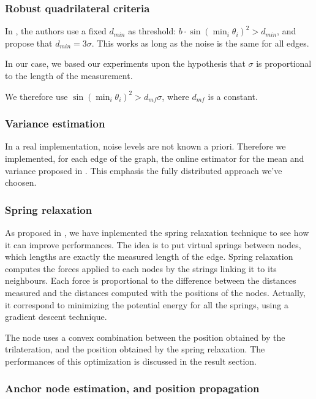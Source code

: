 \documentclass[letterpaper, 10 pt, conference]{ieeeconf}  %
\begin{document}
\subsubsection{Robust quadrilateral criteria}

In \cite{MooreTeller}, the authors use a fixed $d_{min}$ as threshold:  $b \cdot \sin(\min_i \theta_i)^2 > d_{min}$, and propose that $d_{min}=3\sigma$. This works as long as the noise is the same for all edges. 

In our case, we based our experiments upon the hypothesis that $\sigma$ is proportional to the length of the measurement.

We therefore use $\sin(\min_i \theta_i)^2 > d_{mf} \sigma$, where $d_{mf}$ is a constant.

\subsubsection{Variance estimation}

In a real implementation, noise levels are not known a priori. Therefore we implemented, for each edge of the graph, the online estimator for the mean and variance proposed in \cite{Knuth}. This emphasis the fully distributed approach we've choosen.

\subsubsection{Spring relaxation}

As proposed in \cite{MooreTeller}, we have inplemented the spring relaxation technique to see how it can improve performances. The idea is to put virtual springs between nodes, which lengths are exactly the measured length of the edge. Spring relaxation computes the forces applied to each nodes by the strings linking it to its neighbours. Each force is proportional to the difference between the distances measured and the distances computed with the positions of the nodes. Actually, it correspond to minimizing the potential energy for all the springs, using a gradient descent technique.

The node uses a convex combination between the position obtained by the trilateration, and the position obtained by the spring relaxation. The performances of this optimization is discussed in the result section.

\subsubsection{Anchor node estimation, and position propagation}
\end{document}
